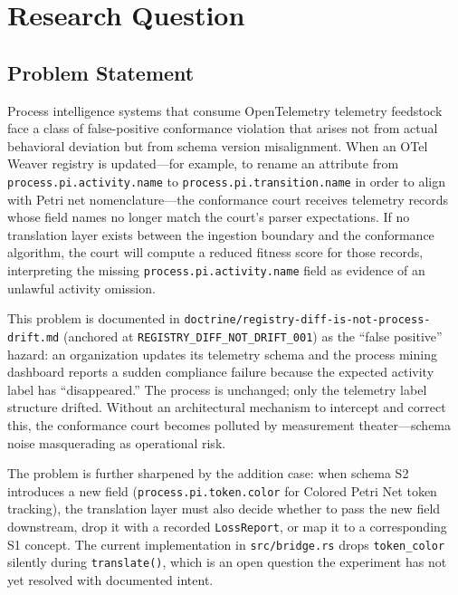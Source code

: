 
\section{Research Question}
\label{sec:otel-weaver-exp-002-diff-to-residual-rq}

\subsection{Problem Statement}
\label{sec:otel-weaver-exp-002-diff-to-residual-rq-problem}

Process intelligence systems that consume OpenTelemetry telemetry feedstock face a
class of false-positive conformance violation that arises not from actual behavioral
deviation but from schema version misalignment. When an OTel Weaver registry is
updated---for example, to rename an attribute from \texttt{process.pi.activity.name}
to \texttt{process.pi.transition.name} in order to align with Petri net
nomenclature---the conformance court receives telemetry records whose field names no
longer match the court's parser expectations. If no translation layer exists between
the ingestion boundary and the conformance algorithm, the court will compute a reduced
fitness score for those records, interpreting the missing \texttt{process.pi.activity.name}
field as evidence of an unlawful activity omission.

This problem is documented in \texttt{doctrine/registry-diff-is-not-process-drift.md}
(anchored at \texttt{REGISTRY\_DIFF\_NOT\_DRIFT\_001}) as the ``false positive'' hazard:
an organization updates its telemetry schema and the process mining dashboard reports
a sudden compliance failure because the expected activity label has ``disappeared.''
The process is unchanged; only the telemetry label structure drifted. Without an
architectural mechanism to intercept and correct this, the conformance court becomes
polluted by measurement theater---schema noise masquerading as operational risk.

The problem is further sharpened by the addition case: when schema S2 introduces
a new field (\texttt{process.pi.token.color} for Colored Petri Net token tracking),
the translation layer must also decide whether to pass the new field downstream, drop
it with a recorded \texttt{LossReport}, or map it to a corresponding S1 concept. The
current implementation in \texttt{src/bridge.rs} drops \texttt{token\_color} silently
during \texttt{translate()}, which is an open question the experiment has not yet
resolved with documented intent.

